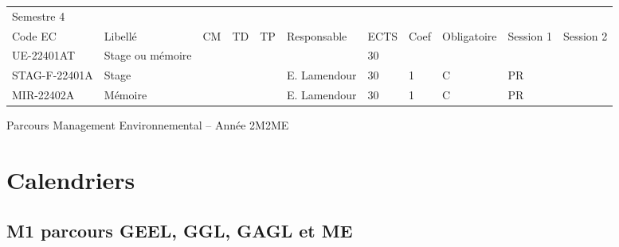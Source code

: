 \documentclass[a4paper,11pt]{article}
\begin{document}
{{\begin{tabular}{lllllllllll}
\rowcolor[HTML]{656565} 
Semestre 4    &                                                                   &    &    &    &                 &      &      &             &                &           \\
\rowcolor[HTML]{9B9B9B} 
Code EC       & Libellé                                                           & CM & TD & TP & Responsable     & ECTS & Coef & Obligatoire & Session 1      & Session 2 \\
\rowcolor[HTML]{C0C0C0} 
UE-22401AT    & Stage ou mémoire                                                  &    &    &    &                 & 30   &      &             &                &           \\
STAG-F-22401A & Stage                                                             &    &    &    & E. Lamendour    & 30   & 1    & C           & PR             &           \\
MIR-22402A    & Mémoire                                                           &    &    &    & E. Lamendour    & 30   & 1    & C           & PR             &          
\end{tabular}}
}{Parcours Management Environnemental -- Année 2}{M2ME}



\section{Calendriers}\label{Calendrier}

\subsection{M1 parcours GEEL, GGL, GAGL et ME}
\end{document}
